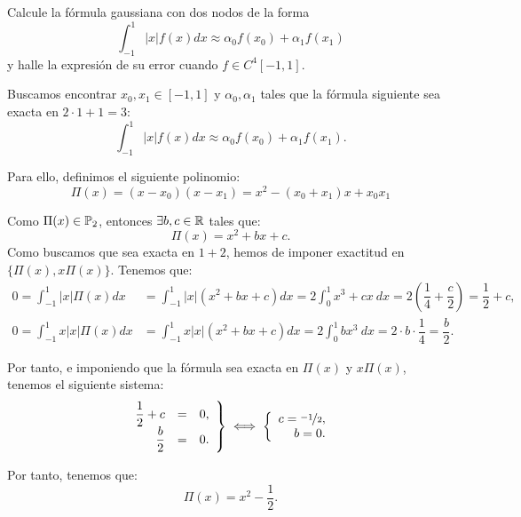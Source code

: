 \begin{ejercicio}\label{ej:2.1.25}
    Calcule la fórmula gaussiana con dos nodos de la forma $$\int_{-1}^{1} |x|f(x) dx \approx \alpha_0 f(x_0) + \alpha_1 f(x_1)$$ y halle la expresión de su error cuando $f \in C^4[-1, 1]$.

    Buscamos encontrar $x_0,x_1\in [-1, 1]$ y $\alpha_0, \alpha_1$ tales que la fórmula siguiente sea exacta en $2\cdot 1+1 = 3$:
    \begin{equation*}
        \int_{-1}^{1} |x|f(x) dx \approx \alpha_0 f(x_0) + \alpha_1 f(x_1).
    \end{equation*}

    Para ello, definimos el siguiente polinomio:
    \begin{equation*}
        \Pi(x) = (x-x_0)(x-x_1) = x^2 - (x_0+x_1)x + x_0x_1
    \end{equation*}

    Como $\Pi(x)\in \mathbb{P}_2$, entonces $\exists b,c\in \mathbb{R}$ tales que:
    \begin{equation*}
        \Pi(x) = x^2+bx+c.
    \end{equation*}
    Como buscamos que sea exacta en $1+2$, hemos de imponer exactitud en $\{\Pi(x), x\Pi(x)\}$. Tenemos que:
    \begin{align*}
        0 = \int_{-1}^{1} |x|\Pi(x) dx &= \int_{-1}^{1} |x|(x^2 + bx + c) dx = 2\int_{0}^{1} x^3+cx\ dx = 2\left(\dfrac{1}{4} + \dfrac{c}{2}\right) = \dfrac{1}{2} + c,\\
        0 = \int_{-1}^{1} x|x|\Pi(x) dx &= \int_{-1}^{1} x|x|(x^2 + bx + c) dx = 2\int_{0}^{1} bx^3 \ dx = 2\cdot b\cdot \dfrac{1}{4} = \dfrac{b}{2}.
    \end{align*}

    Por tanto, e imponiendo que la fórmula sea exacta en $\Pi(x)$ y $x\Pi(x)$, tenemos el siguiente sistema:
    \begin{align*}
        \left.
        \begin{array}{rcl}
            \dfrac{1}{2} + c &=& 0,\\
            \dfrac{b}{2} &=& 0.
        \end{array}
        \right\}
        \iff
        \left\{
        \begin{array}{rcl}
            c=\nicefrac{-1}{2},\\
            b=0.
        \end{array}
        \right.
    \end{align*}

    Por tanto, tenemos que:
    \begin{equation*}
        \Pi(x) = x^2 - \dfrac{1}{2}.
    \end{equation*}


\end{ejercicio}
